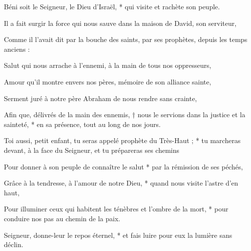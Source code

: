 \item Béni soit le Seigneur, le Dieu d’Israël, * qui visite et rachète son peuple.

\item Il a fait surgir la force qui nous sauve dans la maison de David, son serviteur,

\item Comme il l’avait dit par la bouche des saints, par ses prophètes, depuis les temps anciens :

\item Salut qui nous arrache à l’ennemi, à la main de tous nos oppresseurs,

\item Amour qu’il montre envers nos pères, mémoire de son alliance sainte,

\item Serment juré à notre père Abraham de nous rendre sans crainte,

\item Afin que, délivrés de la main des ennemis, † nous le servions dans la justice et la sainteté, * en sa présence, tout au long de nos jours.

\item Toi aussi, petit enfant, tu seras appelé prophète du Très-Haut ; * tu marcheras devant, à la face du Seigneur, et tu prépareras ses chemins

\item Pour donner à son peuple de connaître le salut * par la rémission de ses péchés,

\item Grâce à la tendresse, à l’amour de notre Dieu, * quand nous visite l’astre d’en haut,

\item Pour illuminer ceux qui habitent les ténèbres et l’ombre de la mort, * pour conduire nos pas au chemin de la paix.

\item Seigneur, donne-leur le repos éternel, * et fais luire pour eux la lumière sans déclin.